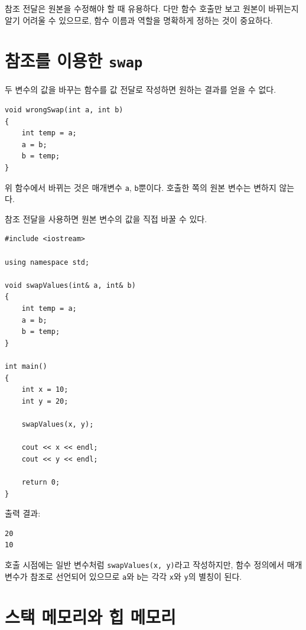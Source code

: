 \documentclass[11pt,a4paper]{article}
\begin{document}
\begin{importantbox}
참조 전달은 원본을 수정해야 할 때 유용하다.
다만 함수 호출만 보고 원본이 바뀌는지 알기 어려울 수 있으므로, 함수 이름과 역할을 명확하게 정하는 것이 중요하다.
\end{importantbox}

\section{참조를 이용한 \texttt{swap}}

두 변수의 값을 바꾸는 함수를 값 전달로 작성하면 원하는 결과를 얻을 수 없다.

\begin{lstlisting}
void wrongSwap(int a, int b)
{
    int temp = a;
    a = b;
    b = temp;
}
\end{lstlisting}

위 함수에서 바뀌는 것은 매개변수 \texttt{a}, \texttt{b}뿐이다.
호출한 쪽의 원본 변수는 변하지 않는다.

참조 전달을 사용하면 원본 변수의 값을 직접 바꿀 수 있다.

\begin{lstlisting}
#include <iostream>

using namespace std;

void swapValues(int& a, int& b)
{
    int temp = a;
    a = b;
    b = temp;
}

int main()
{
    int x = 10;
    int y = 20;

    swapValues(x, y);

    cout << x << endl;
    cout << y << endl;

    return 0;
}
\end{lstlisting}

출력 결과:

\begin{verbatim}
20
10
\end{verbatim}

호출 시점에는 일반 변수처럼 \texttt{swapValues(x, y)}라고 작성하지만, 함수 정의에서 매개변수가 참조로 선언되어 있으므로 \texttt{a}와 \texttt{b}는 각각 \texttt{x}와 \texttt{y}의 별칭이 된다.

\section{스택 메모리와 힙 메모리}
\end{document}
